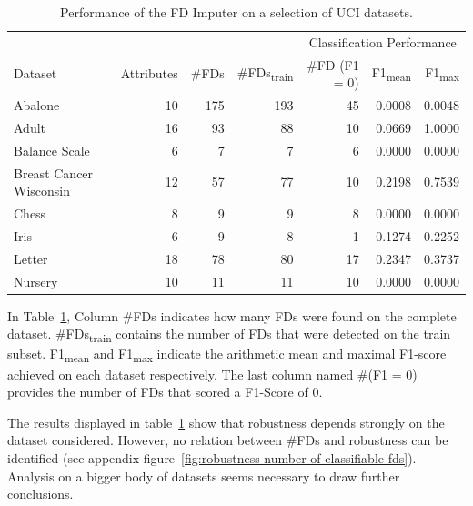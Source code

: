 \begin{table}[ht]
    \centering
    \begin{tabular}{lrrrrrr}
        & & & & \multicolumn{3}{c}{Classification Performance} \\
        \cmidrule(lr{.25em}){5-7}
        Dataset & Attributes & \#FDs & \#FDs\textsubscript{train} & \#FD (F1 = 0) & F1\textsubscript{mean} & F1\textsubscript{max} \\
        \midrule
        Abalone & 10 & 175 & 193 & 45 & 0.0008 & 0.0048 \\
        Adult & 16 & 93 & 88 & 10 & 0.0669 & 1.0000 \\
        Balance Scale & 6 & 7 & 7 & 6 & 0.0000 & 0.0000 \\
        Breast Cancer Wisconsin & 12 & 57 & 77 & 10 & 0.2198 & 0.7539 \\
        Chess & 8 & 9 & 9 & 8 & 0.0000 & 0.0000 \\
        Iris & 6 & 9 & 8 & 1 & 0.1274 & 0.2252 \\
        Letter & 18 & 78 & 80 & 17 & 0.2347 & 0.3737 \\
        Nursery & 10 & 11 & 11 & 10 & 0.0000 & 0.0000  \\
        \bottomrule
    \end{tabular}
    \caption{Performance of the FD Imputer on a selection of UCI datasets.}\label{tab:fd-imputer-performance}
\end{table}

In Table~\ref{tab:fd-imputer-performance}, Column \#FDs indicates how many FDs were found on the complete dataset.
\#FDs\textsubscript{train} contains the number of FDs that were detected on the train subset.
F1\textsubscript{mean} and F1\textsubscript{max} indicate the arithmetic mean and maximal F1-score achieved on each dataset respectively.
The last column named \#(F1 = 0) provides the number of FDs that scored a F1-Score of 0.

The results displayed in table~\ref{tab:fd-imputer-performance} show that robustness depends strongly on the dataset considered.
However, no relation between #FDs and robustness can be identified (see appendix figure~\ref{fig:robustness-number-of-classifiable-fds}).
Analysis on a bigger body of datasets seems necessary to draw further conclusions.

